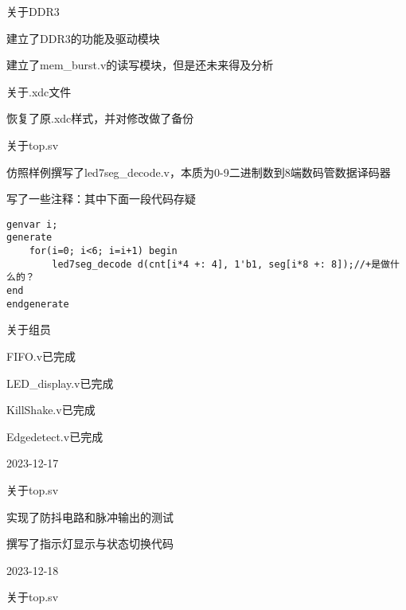 \begin{compactitem}
\begin{compactitem}
\begin{compactitem}
		\end{compactitem}
		\item 关于DDR3
		\begin{compactitem}
			\item 建立了DDR3的功能及驱动模块
			\item 建立了mem\_burst.v的读写模块，但是还未来得及分析
		\end{compactitem}
		\item 关于.xdc文件
		\begin{compactitem}
			\item 恢复了原.xdc样式，并对修改做了备份
		\end{compactitem}
		\item 关于top.sv
		\begin{compactitem}
			\item 仿照样例撰写了led7seg\_decode.v，本质为0-9二进制数到8端数码管数据译码器
			\item 写了一些注释：其中下面一段代码存疑
			\begin{lstlisting}[style=verilog]
genvar i;
generate 
	for(i=0; i<6; i=i+1) begin
		led7seg_decode d(cnt[i*4 +: 4], 1'b1, seg[i*8 +: 8]);//+是做什么的？
end
endgenerate
			\end{lstlisting}
		\end{compactitem}
		\item 关于组员
		\begin{compactitem}
			\item FIFO.v已完成
			\item LED\_display.v已完成
			\item KillShake.v已完成
			\item Edgedetect.v已完成
		\end{compactitem}
	\end{compactitem}
	\item 2023-12-17
	\begin{compactitem}
		\item 关于top.sv
		\begin{compactitem}
			\item 实现了防抖电路和脉冲输出的测试
			\item 撰写了指示灯显示与状态切换代码
		\end{compactitem}
	\end{compactitem}
	\item 2023-12-18
	\begin{compactitem}
		\item 关于top.sv
		\begin{compactitem}

\end{compactitem}
\end{compactitem}
\end{compactitem}
